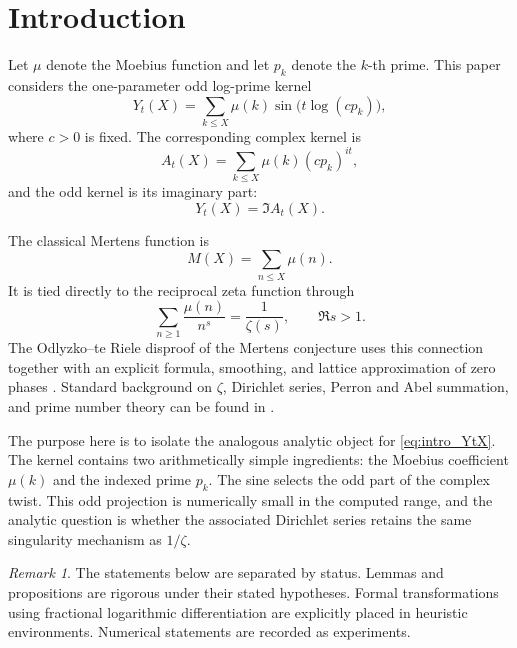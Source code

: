 \documentclass[11pt]{amsart}
\numberwithin{equation}{section}
\theoremstyle{plain}
\theoremstyle{definition}
\theoremstyle{remark}
\newtheorem{remark}[theorem]{Remark}
\begin{document}
\tableofcontents

\bigskip

\section{Introduction}
\label{sec:introduction}

Let $\mu$ denote the Moebius function and let $p_k$ denote the $k$-th
prime.  This paper considers the one-parameter odd log-prime kernel
\begin{equation}
Y_t(X)=\sum_{k\le X}\mu(k)\sin\bigl(t\log(c p_k)\bigr),
\label{eq:intro_YtX}
\end{equation}
where $c>0$ is fixed.  The corresponding complex kernel is
\begin{equation}
A_t(X)=\sum_{k\le X}\mu(k)(c p_k)^{it},
\label{eq:intro_AtX}
\end{equation}
and the odd kernel is its imaginary part:
\begin{equation}
Y_t(X)=\Im A_t(X).
\label{eq:intro_imag_relation}
\end{equation}

The classical Mertens function is
\begin{equation}
M(X)=\sum_{n\le X}\mu(n).
\label{eq:intro_MX}
\end{equation}
It is tied directly to the reciprocal zeta function through
\begin{equation}
\sum_{n\ge1}\frac{\mu(n)}{n^s}=\frac1{\zeta(s)},
\qquad \Re s>1.
\label{eq:intro_mobius_zeta}
\end{equation}
The Odlyzko--te Riele disproof of the Mertens conjecture uses this
connection together with an explicit formula, smoothing, and lattice
approximation of zero phases \cite{OdlyzkoTeRiele1985}.  Standard
background on $\zeta$, Dirichlet series, Perron and Abel summation, and
prime number theory can be found in \cite{Titchmarsh1986,Edwards2001,Davenport2000,MontgomeryVaughan2007,IwaniecKowalski2004}.

The purpose here is to isolate the analogous analytic object for
\eqref{eq:intro_YtX}.  The kernel contains two arithmetically simple
ingredients: the Moebius coefficient $\mu(k)$ and the indexed prime
$p_k$.  The sine selects the odd part of the complex twist.  This odd
projection is numerically small in the computed range, and the analytic
question is whether the associated Dirichlet series retains the same
singularity mechanism as $1/\zeta$.

\begin{remark}
\label{rem:paper_status}
The statements below are separated by status.  Lemmas and propositions
are rigorous under their stated hypotheses.  Formal transformations using
fractional logarithmic differentiation are explicitly placed in
heuristic environments.  Numerical statements are recorded as experiments.
\end{remark}
\end{document}
